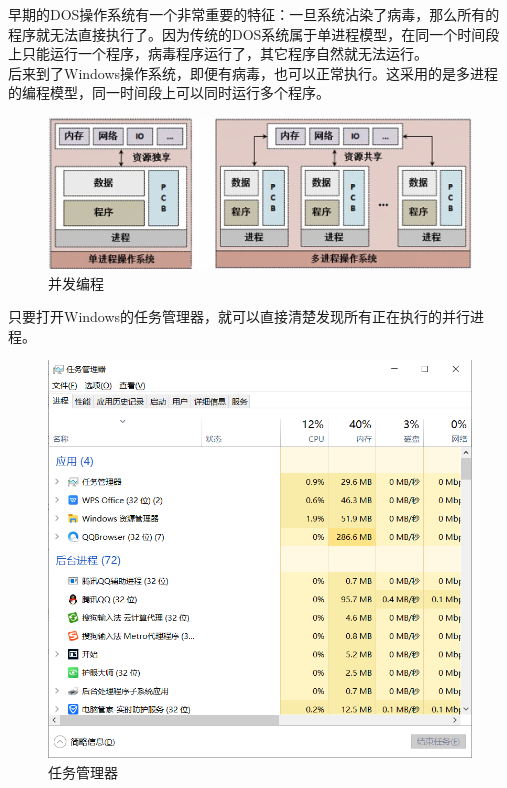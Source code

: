 早期的DOS操作系统有一个非常重要的特征：一旦系统沾染了病毒，那么所有的程序就无法直接执行了。因为传统的DOS系统属于单进程模型，在同一个时间段上只能运行一个程序，病毒程序运行了，其它程序自然就无法运行。 \\

后来到了Windows操作系统，即便有病毒，也可以正常执行。这采用的是多进程的编程模型，同一时间段上可以同时运行多个程序。

\begin{figure}[H]
	\centering
	\includegraphics[scale=0.6]{img/C1/1-6/3.png}
	\caption{并发编程}
\end{figure}

只要打开Windows的任务管理器，就可以直接清楚发现所有正在执行的并行进程。

\begin{figure}[H]
	\centering
	\includegraphics[scale=0.7]{img/C1/1-6/4.png}
	\caption{任务管理器}
\end{figure}

